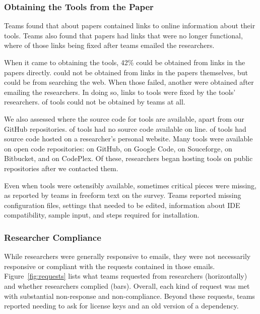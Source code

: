 \documentclass[10pt,conference]{IEEEtran}
\begin{document}

\subsubsection{Obtaining the Tools from the Paper}

Teams found that about \papersWithLinks papers
contained links to online information about their tools.
Teams also found that \papersWithLinksDead papers
had links that were no longer functional,
where \papersWithLinksRevived of those links
being fixed after teams emailed the researchers.

When it came to obtaining the tools, 42\%
could be obtained from links in 
the papers directly.
\obtainGoogle could not be obtained from
links in the papers themselves, but could be
from searching the web.
When those failed, another \obtainEmail were 
obtained after emailing the researchers.
In doing so, \contactFixLink links to tools 
were fixed by the tools' researchers.
\obtainNot of tools could not be obtained
by teams at all.

We also assessed where the source code for tools are available,
apart from our GitHub repositories.
\onlineNotAvail of tools had no source code available 
on line.
\onlinePersonalSite of tools had source code hosted
on a researcher's personal website.
Many tools were available on open code repositories:
\onlineGitHub on GitHub, 
\onlineGcode on Google Code,
\onlineSourceforge on Souceforge,
\onlineBitbucket on Bitbucket,
and \onlineCodeplex on CodePlex.
Of these, researchers began hosting \contactHosted tools 
on public repositories after
we contacted them.

Even when tools were ostensibly available,
sometimes critical pieces were missing,
as reported by teams in freeform text on the survey.
Teams reported missing configuration files,
settings that needed to be edited, 
information about IDE compatibility,
sample input,
and steps required for installation. 

\subsubsection{Researcher Compliance}

While researchers were generally responsive to emails,
they were not necessarily responsive or compliant 
with the requests contained in those emails.
Figure~\ref{fig:requests} lists what teams requested from researchers
(horizontally) and whether researchers complied (bars).
Overall, each kind of request was met with substantial non-response and
non-compliance.
Beyond these requests, teams reported needing to ask for 
license keys and
an old version of a dependency.
\end{document}
